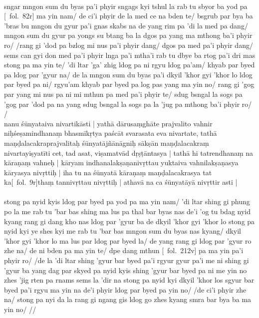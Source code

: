 \documentclass[12pt]{article}
\begin{document}
\textbf{\TVB}\\
sngar mngon sum du byas pa'i phyir sngags kyi tshul la rab tu sbyor ba yod pa [\TVB\ fol.\ 82r] ma yin nam/ de ci'i phyir de la med ce na bden te/ bsgrub par bya ba 'bras bu mngon du gyur pa'i gnas skabs na de yang rim pa 'di la med pa dang/ mngon sum du gyur pa yongs su btang ba la dgos pa yang ma mthong ba'i phyir ro/ /rang gi 'dod pa bzlog mi nus pa'i phyir dang/ dgos pa med pa'i phyir dang/ sems can gyi don med pa'i phyir lnga pa'i mtha'i rab tu dbye ba rtog pa'i dri mas stong pa ma yin te/ 'di ltar 'ga' zhig ldog pa ni rgyu ldog pa'am/ khyab par byed pa ldog par 'gyur na/ de la mngon sum du byas pa'i dkyil 'khor gyi 'khor lo ldog par byed pa ni/ rgyu'am khyab par byed pa log pas yang ma yin no/ rang gi 'gog par yang mi nus pa ni mi mthun pa med pa'i phyir te/ sdug bsngal la sogs pa 'gog par 'dod pa na yang sdug bsngal la sogs pa la 'jug pa mthong ba'i phyir ro/ /\\

nanu śūnyataiva nivartikāsti | yathā dārusaṃghāte prajvalito vahnir niḥśeṣamindhanaṃ bhasmīkṛtya paścāt svarasata eva nivartate, tathā maṇḍalacakraprajvalitaḥ śūnyatājñānāgniḥ sākṣān maṇḍalacakraṃ nivartayiṣyatīti cet, tad asat, viṣamatvād dṛṣṭāntasya | tathā hi tatrendhanaṃ na kāraṇaṃ vahneḥ | kāryam indhanalakṣaṇanivṛttau yuktaiva vahnilakṣaṇasya kāryasya nivṛttiḥ | iha tu na śūnyatā kāraṇaṃ maṇḍalacakrasya tat ka[\MS\ fol.\ 9r]thaṃ tannivṛttau nivṛttiḥ | athavā na ca śūnyatāyā nivṛttir asti |\\

\textbf{\TVA}\\
stong pa nyid kyis ldog par byed pa yod pa ma yin nam/ 'di ltar shing gi phung po la me rab tu 'bar bas shing ma lus pa thal bar byas nas de'i 'og tu bdag nyid kyang rang gi dang kho nas ldog par 'gyur ba de dkyil 'khor gyi 'khor lo stong pa nyid kyi ye shes kyi me rab tu 'bar bas mngon sum du byas nas kyang/ dkyil 'khor gyi 'khor lo ma lus par ldog par byed la/ de yang rang gi ldog par 'gyur ro zhe na/ de ni bden pa ma yin te/ dpe dang mthun [\TVA\ fol.\ 212v] pa ma yin pa'i phyir ro/ /de la 'di ltar shing 'gyur bar byed pa'i rgyur gyur pa'i me ni shing gi 'gyur ba yang dag par skyed pa nyid kyis shing 'gyur bar byed pa ni me yin no zhes 'jig rten pa rnams sems la 'dir na stong pa nyid kyi dkyil 'khor los sgyur bar byed pa'i rgyu ma yin na de'i phyir ldog par byed pa yin no/ /de ci'i phyir zhe na/ stong pa nyi da la rang gi ngang gis ldog go zhes kyang smra bar bya ba ma yin no/ //\\
\end{document}
